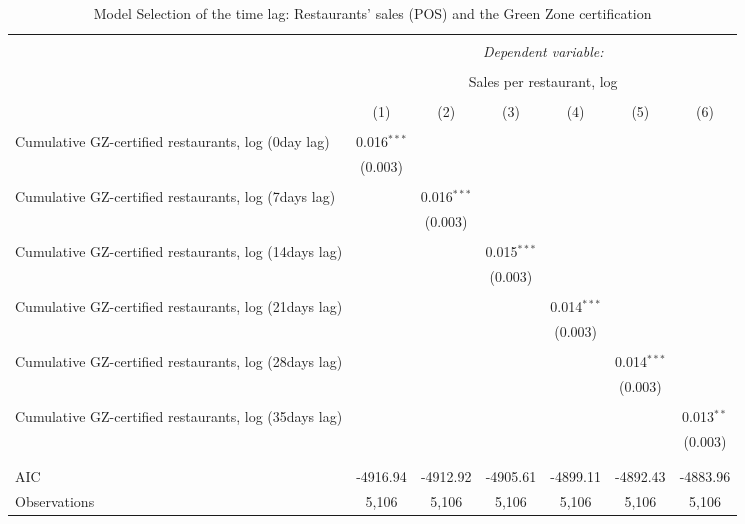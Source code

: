 
\begin{table}[!htbp] \centering 
  \caption{Model Selection of the time lag: Restaurants' sales (POS) and the Green Zone certification} 
  \label{} 
\scriptsize 
\begin{tabular}{@{\extracolsep{1pt}}lcccccc} 
\\[-1.8ex]\hline 
\hline \\[-1.8ex] 
 & \multicolumn{6}{c}{\textit{Dependent variable:}} \\ 
\cline{2-7} 
\\[-1.8ex] & \multicolumn{6}{c}{Sales per restaurant, log} \\ 
\\[-1.8ex] & (1) & (2) & (3) & (4) & (5) & (6)\\ 
\hline \\[-1.8ex] 
 Cumulative GZ-certified restaurants, log (0day lag) & 0.016$^{***}$ &  &  &  &  &  \\ 
  & (0.003) &  &  &  &  &  \\ 
  & & & & & & \\ 
 Cumulative GZ-certified restaurants, log (7days lag) &  & 0.016$^{***}$ &  &  &  &  \\ 
  &  & (0.003) &  &  &  &  \\ 
  & & & & & & \\ 
 Cumulative GZ-certified restaurants, log (14days lag) &  &  & 0.015$^{***}$ &  &  &  \\ 
  &  &  & (0.003) &  &  &  \\ 
  & & & & & & \\ 
 Cumulative GZ-certified restaurants, log (21days lag) &  &  &  & 0.014$^{***}$ &  &  \\ 
  &  &  &  & (0.003) &  &  \\ 
  & & & & & & \\ 
 Cumulative GZ-certified restaurants, log (28days lag) &  &  &  &  & 0.014$^{***}$ &  \\ 
  &  &  &  &  & (0.003) &  \\ 
  & & & & & & \\ 
 Cumulative GZ-certified restaurants, log (35days lag) &  &  &  &  &  & 0.013$^{**}$ \\ 
  &  &  &  &  &  & (0.003) \\ 
  & & & & & & \\ 
\hline \\[-1.8ex] 
AIC & -4916.94 & -4912.92 & -4905.61 & -4899.11 & -4892.43 & -4883.96 \\ 
Observations & 5,106 & 5,106 & 5,106 & 5,106 & 5,106 & 5,106 \\ 

\end{tabular}
\end{table}
